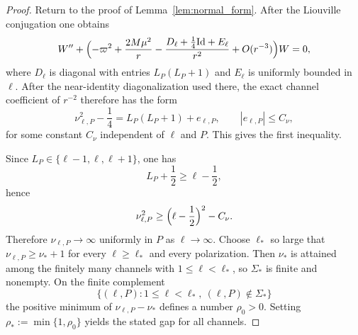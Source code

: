 \documentclass[12pt]{article}
\numberwithin{equation}{section}
\theoremstyle{plain}
\theoremstyle{definition}
\theoremstyle{remark}
\newcommand{\vp}{\varpi}
\newcommand{\abs}[1]{\left|#1\right|}
\newcommand{\Id}{\mathrm{Id}}
\begin{document}
\begin{proof}
Return to the proof of Lemma~\ref{lem:normal_form}.  After the Liouville conjugation one obtains
\[
   W''+\Bigl(-\vp^2+\frac{2M\mu^2}{r}-\frac{D_\ell+\frac14\Id+E_\ell}{r^2}+O(r^{-3})\Bigr)W=0,
\]
where $D_\ell$ is diagonal with entries $L_P(L_P+1)$ and $E_\ell$ is uniformly bounded in $\ell$.  After the near-identity diagonalization used there, the exact channel coefficient of $r^{-2}$ therefore has the form
\[
   \nu_{\ell,P}^2-\frac14
   =
   L_P(L_P+1)+e_{\ell,P},
   \qquad
   \abs{e_{\ell,P}}\le C_\nu,
\]
for some constant $C_\nu$ independent of $\ell$ and $P$.  This gives the first inequality.

Since $L_P\in\{\ell-1,\ell,\ell+1\}$, one has
\[
   L_P+\frac12\ge\ell-\frac12,
\]
hence
\[
   \nu_{\ell,P}^2\ge\Bigl(\ell-\frac12\Bigr)^2-C_\nu.
\]
Therefore $\nu_{\ell,P}\to\infty$ uniformly in $P$ as $\ell\to\infty$.  Choose $\ell_*$ so large that $\nu_{\ell,P}\ge\nu_*+1$ for every $\ell\ge\ell_*$ and every polarization.  Then $\nu_*$ is attained among the finitely many channels with $1\le\ell<\ell_*$, so $\Sigma_*$ is finite and nonempty.  On the finite complement
\[
   \{(\ell,P):1\le\ell<\ell_*,\ (\ell,P)\notin\Sigma_*\}
\]
the positive minimum of $\nu_{\ell,P}-\nu_*$ defines a number $\rho_0>0$.  Setting $\rho_*:=\min\{1,\rho_0\}$ yields the stated gap for all channels.
\end{proof}
\end{document}
